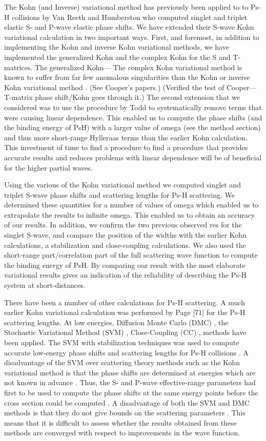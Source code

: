 \documentclass[preprint,showpacs,preprintnumbers,amsmath,amssymb]{revtex4}
\begin{document}
The Kohn (and Inverse) variational method has previously been applied to
to Ps-H collisions by 
Van Reeth and Humberston \cite{} who computed singlet and triplet elastic
S- and P-wave elastic phase shifts. 
We have extended their S-wave Kohn variational calculation in two important ways.
First, and foremost, in addition to implementing
the Kohn and inverse Kohn variational methods, we have
implemented the generalized Kohn and the complex Kohn
for the S and T-matrices. The generalized Kohn---
The complex Kohn variational method is known to suffer
from far few anomalous singularities than the
Kohn or inverse Kohn variational method \cite{}. 
(See Cooper's papers.) (Verified the test of Cooper---T-matrix
phase shift/Kohn goes through it.)
The second extension that we considered was to use
the procedure by Todd to systematically remove terms that
were causing linear dependence.
This enabled us to compute the phase shifts (and the binding
energy of PsH) with a larger value of omega (see the method section)
and thus more short-range Hylleraas terms than the earlier 
Kohn calculation. 
This investment of time to find a procedure to find
a procedure that provides accurate results
and reduces problems with linear dependence
will be of beneficial for the higher partial waves.

Using the various of the Kohn variational method we 
computed singlet and triplet S-wave 
phase shifts and scattering lengths for Ps-H scattering.
We determined these quantities for a number of values
of omega which enabled us to
extrapolate the results to infinite omega.
This enabled us to obtain an accuracy of our results.
In addition, we confirm the two previous observed res
for the singlet S-wave, and compare the
position of the widths with the earlier Kohn calculations,
a stabilization and close-coupling calculations.
We also used the short-range part/correlation part of
the full scattering wave function to compute
the binding energy of PsH.
By comparing our result with the most elaborate
variational results gives an indication of the
reliability  of describing the Ps-H system
at short-distances.

There have been a number of other calculations for
Ps-H scattering. A much earlier Kohn variational calculation was performed
by Page [71] for the Ps-H scattering lengths.
At low energies, Diffusion Monte Carlo (DMC) \cite{},
the Stochastic  Variational Method (SVM) \cite{},  Close-Coupling (CC) \cite{}, 
 methods have been applied.
The SVM with stabilization techniques was used to compute
accurate low-energy phase shifts and scattering lengths for Ps-H collisions \cite{}.
A disadvantage of the SVM over scattering theory methods
such as the Kohn variational method is that the phase shifts
are  determined at energies which  are not  known in advance \cite{}.
Thus,  the S- and P-wave
effective-range parameters had first to be used to compute the phase shifts at the same energy
points before the cross section could be computed \cite{}. 
A disadvantage of both the SVM 
and DMC  methods is that they do not  give
bounds on the scattering parameters \cite{}.
This means that it is difficult to assess whether the results
obtained from these methods are converged with respect
to improvements in the wave function.
\end{document}
